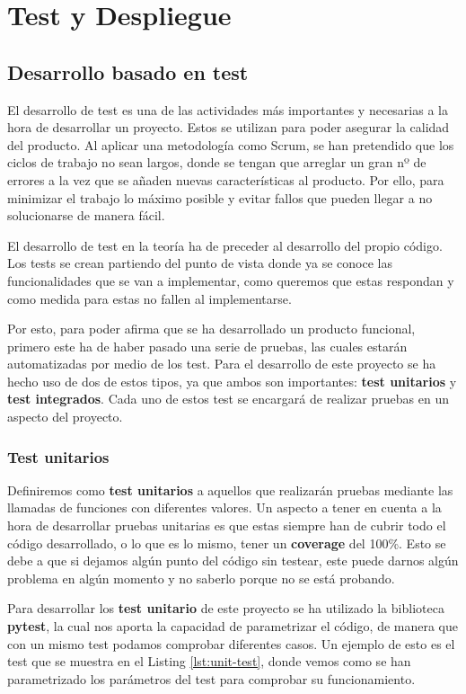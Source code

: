 \chapter{Test y Despliegue}

\section{Desarrollo basado en test}

El desarrollo de test es una de las actividades más importantes y necesarias a la hora de desarrollar un proyecto. Estos se utilizan para poder asegurar la calidad del producto. Al aplicar una metodología como Scrum, se han pretendido que los ciclos de trabajo no sean largos, donde se tengan que arreglar un gran nº de errores a la vez que se añaden nuevas características al producto. Por ello, para minimizar el trabajo lo máximo posible y evitar fallos que pueden llegar a no solucionarse de manera fácil.

El desarrollo de test en la teoría ha de preceder al desarrollo del propio código. Los tests se crean partiendo del punto de vista donde ya se conoce las funcionalidades que se van a implementar, como queremos que estas respondan y como medida para estas no fallen al implementarse.

Por esto, para poder afirma que se ha desarrollado un producto funcional, primero este ha de haber pasado una serie de pruebas, las cuales estarán automatizadas por medio de los test. Para el desarrollo de este proyecto se ha hecho uso de dos de estos tipos, ya que ambos son importantes: \textbf{test unitarios} y \textbf{test integrados}. Cada uno de estos test se encargará de realizar pruebas en un aspecto del proyecto.

\subsection{Test unitarios}

Definiremos como \textbf{test unitarios} a aquellos que realizarán pruebas mediante las llamadas de funciones con diferentes valores. Un aspecto a tener en cuenta a la hora de desarrollar pruebas unitarias es que estas siempre han de cubrir todo el código desarrollado, o lo que es lo mismo, tener un \textbf{coverage} del 100\%. Esto se debe a que si dejamos algún punto del código sin testear, este puede darnos algún problema en algún momento y no saberlo porque no se está probando.

Para desarrollar los \textbf{test unitario} de este proyecto se ha utilizado la biblioteca \textbf{pytest}, la cual nos aporta la capacidad de parametrizar el código, de manera que con un mismo test podamos comprobar diferentes casos. Un ejemplo de esto es el test que se muestra en el Listing \ref{lst:unit-test}, donde vemos como se han parametrizado los parámetros del test para comprobar su funcionamiento.

